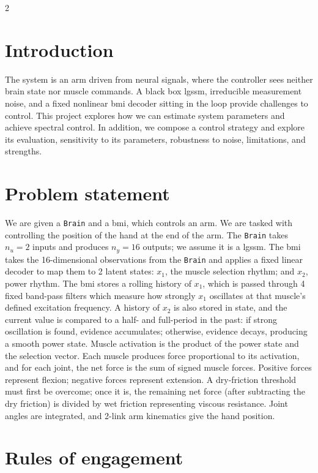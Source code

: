 \documentclass[a4paper, 10pt]{article}
\newcommand{\Brain}{\texttt{Brain}\xspace}
\newcommand{\LGSSM}{\ac{lgssm}\xspace}
\newcommand{\BMI}{\ac{bmi}\xspace}
\begin{document}
\begin{multicols*}{2}
  \section*{Introduction}

  The system is an arm driven from neural signals, where the controller sees
  neither brain state nor muscle commands. A black box \LGSSM, irreducible
  measurement noise, and a fixed nonlinear \BMI decoder sitting in the loop
  provide challenges to control. This project explores how we can estimate
  system parameters and achieve spectral control. In addition, we compose a
  control strategy and explore its evaluation, sensitivity to its parameters,
  robustness to noise, limitations, and strengths.

  \section*{Problem statement}

  We are given a \Brain and a \ac{bmi}, which controls an arm. We are tasked
  with controlling the position of the hand at the end of the arm. The \Brain
  takes $n_u=2$ inputs and produces $n_y=16$ outputs; we assume it is a
  \ac{lgssm}. The \ac{bmi} takes the 16-dimensional observations from the \Brain
  and applies a fixed linear decoder to map them to 2 latent states: $x_1$, the
  muscle selection rhythm; and $x_2$, power rhythm. The \ac{bmi} stores a
  rolling history of $x_1$, which is passed through 4 fixed band-pass filters
  which measure how strongly $x_1$ oscillates at that muscle's defined
  excitation frequency. A history of $x_2$ is also stored in state, and the
  current value is compared to a half- and full-period in the past: if strong
  oscillation is found, evidence accumulates; otherwise, evidence decays,
  producing a smooth power state. Muscle activation is the product of the power state
  and the selection vector. Each muscle produces force proportional to its
  activation, and for each joint, the net force is the sum of signed muscle
  forces. Positive forces represent flexion; negative forces represent
  extension. A dry-friction threshold must first be overcome; once it is, the remaining net force (after subtracting the dry friction) is
  divided by wet friction representing viscous resistance. Joint angles are
  integrated, and 2-link arm kinematics give the hand position.

  \section*{Rules of engagement}


\end{multicols*}
\end{document}
